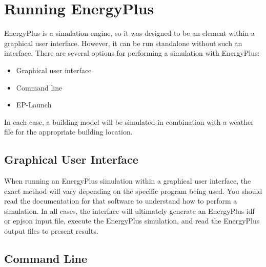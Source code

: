 \section{Running EnergyPlus}

EnergyPlus is a simulation engine, so it was designed to be an element
within a graphical user interface. However, it can be run standalone
without such an interface. There are several options for performing
a simulation with EnergyPlus:
\begin{itemize}
\item Graphical user interface
\item Command line
\item EP-Launch
\end{itemize}
In each case, a building model will be simulated in combination with
a weather file for the appropriate building location. 

\subsection*{Graphical User Interface}

When running an EnergyPlus simulation within a graphical user interface,
the exact method will vary depending on the specific program being
used. You should read the documentation for that software to understand
how to perform a simulation. In all cases, the interface will ultimately
generate an EnergyPlus idf or epjson input file, execute the EnergyPlus
simulation, and read the EnergyPlus output files to present results.

\subsection*{Command Line}


